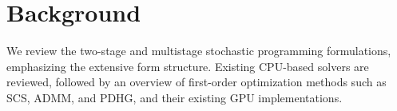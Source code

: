 \section{Background}
We review the two-stage and multistage stochastic programming formulations, emphasizing the extensive form structure. Existing CPU-based solvers are reviewed, followed by an overview of first-order optimization methods such as SCS, ADMM, and PDHG, and their existing GPU implementations.